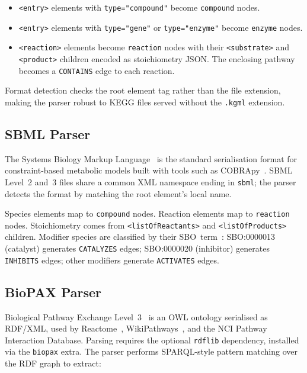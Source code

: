 \documentclass[10pt]{article}
\begin{document}
\begin{itemize}[leftmargin=*,itemsep=2pt]
  \item \texttt{<entry>} elements with \texttt{type="compound"} become
    \texttt{compound} nodes.
  \item \texttt{<entry>} elements with \texttt{type="gene"} or
    \texttt{type="enzyme"} become \texttt{enzyme} nodes.
  \item \texttt{<reaction>} elements become \texttt{reaction} nodes with
    their \texttt{<substrate>} and \texttt{<product>} children encoded as
    stoichiometry JSON. The enclosing pathway becomes a \texttt{CONTAINS}
    edge to each reaction.
\end{itemize}

Format detection checks the root element tag rather than the file extension,
making the parser robust to KEGG files served without the \texttt{.kgml}
extension.

\subsection{SBML Parser}

The Systems Biology Markup Language~\citep{keating2020sbml} is the standard
serialisation format for constraint-based metabolic models built with tools
such as COBRApy~\citep{ebrahim2013cobrapy}. SBML Level~2 and~3 files share a
common XML namespace ending in \texttt{sbml}; the parser detects the format by
matching the root element's local name.

Species elements map to \texttt{compound} nodes. Reaction elements map to
\texttt{reaction} nodes. Stoichiometry comes from
\texttt{<listOfReactants>} and \texttt{<listOfProducts>} children. Modifier
species are classified by their SBO~term~\citep{courtot2011sbo}: SBO:0000013
(catalyst) generates \texttt{CATALYZES} edges; SBO:0000020 (inhibitor)
generates \texttt{INHIBITS} edges; other modifiers generate
\texttt{ACTIVATES} edges.

\subsection{BioPAX Parser}

Biological Pathway Exchange Level~3~\citep{demir2010biopax} is an OWL
ontology serialised as RDF/XML, used by Reactome~\citep{jassal2020reactome},
WikiPathways~\citep{martens2021wikipathways}, and the NCI Pathway Interaction
Database. Parsing requires the optional \texttt{rdflib} dependency, installed
via the \texttt{biopax} extra. The parser performs SPARQL-style pattern
matching over the RDF graph to extract:
\end{document}
